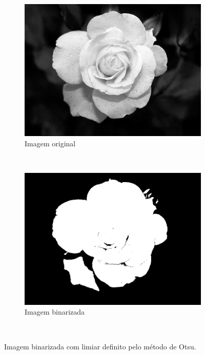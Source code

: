 \begin{figure}[H]
  \centering

  \begin{subfigure}{0.3\textwidth}
    \includegraphics[width=\textwidth]{imagens/flor_branca_pb2.jpg}
    \caption{Imagem original}
    \label{fig:flor1}
  \end{subfigure}~
  \begin{subfigure}{0.3\textwidth}
    \includegraphics[width=\textwidth]{imagens/flor_branca_pb2_lm.jpg}
    \caption{Imagem binarizada}
    \label{fig:flor2}
  \end{subfigure}~

  \caption{ Imagem binarizada com limiar definito pelo método de Otsu. }
  \label{fig:bin_otsu}
\end{figure}


